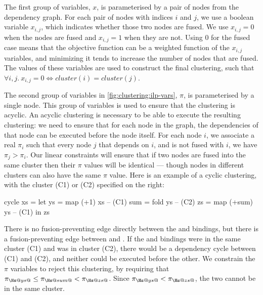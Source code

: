 The first group of variables, $x$, is parameterised by a pair of nodes from the dependency graph.
For each pair of nodes with indices $i$ and $j$, we use a boolean variable $x_{i,j}$, which indicates whether those two nodes are fused.
We use $x_{i,j} = 0$ when the nodes are fused and $x_{i,j} = 1$ when they are not.
Using $0$ for the fused case means that the objective function can be a weighted function of the $x_{i,j}$ variables, and minimizing it tends to increase the number of nodes that are fused.
The values of these variables are used to construct the final clustering, such that $\forall i,j.\ x_{i,j} = 0 \iff \mathit{cluster}(i) = \mathit{cluster}(j)$.

The second group of variables in \cref{fig:clustering:ilp-vars}, $\pi$, is parameterised by a single node.
This group of variables is used to ensure that the clustering is acyclic.
An acyclic clustering is necessary to be able to execute the resulting clustering: we need to ensure that for each node in the graph, the dependencies of that node can be executed before the node itself.
For each node $i$, we associate a real $\pi_i$ such that every node $j$ that depends on $i$, and is not fused with $i$, we have $\pi_j > \pi_i$.
Our linear constraints will ensure that if two nodes are fused into the same cluster then their $\pi$ values will be identical --- though nodes in different clusters can also have the same $\pi$ value.
Here is an example of a cyclic clustering, with the cluster (C1) or (C2) specified on the right:
\begin{haskell}
  cycle xs  = let ys  = map (+1) xs     -- (C1)
                  sum = fold ys         -- (C2)
                  zs  = map (+sum) ys   -- (C1)
              in  zs
\end{haskell}

There is no fusion-preventing edge directly between the \Hs@xs@ and \Hs@zs@ bindings, but there is a fusion-preventing edge between \Hs@sum@ and \Hs@zs@.
If the \Hs@xs@ and \Hs@zs@ bindings were in the same cluster (C1) and \Hs@sum@ was in cluster (C2), there would be a dependency cycle between (C1) and (C2), and neither could be executed before the other.
We constrain the $\pi$ variables to reject this clustering, by requiring that $\pi_{\Hs@ys@} \le \pi_{\Hs@sum@} < \pi_{\Hs@zs@}$.
Since $\pi_{\Hs@ys@} < \pi_{\Hs@zs@}$, the two cannot be in the same cluster.


